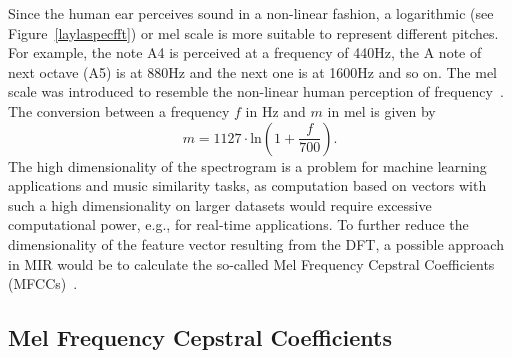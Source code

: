 \FloatBarrier
\noindent Since the human ear perceives sound in a non-linear fashion, a logarithmic (see Figure~\ref{laylaspecfft}) or mel scale is more suitable to represent different pitches. For example, the note A4 is perceived at a frequency of 440Hz, the A note of next octave (A5) is at 880Hz and the next one is at 1600Hz and so on. The mel scale was introduced to resemble the non-linear human perception of frequency~\cite[pp. 53f]{knees1}. The conversion between a frequency $f$ in $\text{Hz}$ and $m$ in $\text{mel}$ is given by
\begin{equation} \label{eq:mel}
m = 1127 \cdot \text{ln}(1 + \frac{f}{700}).
\end{equation}
\noindent The high dimensionality of the spectrogram is a problem for machine learning applications and music similarity tasks, as computation based on vectors with such a high dimensionality on larger datasets would require excessive computational power, e.g., for real-time applications.
To further reduce the dimensionality of the feature vector resulting from the DFT, a possible approach in MIR would be to calculate the so-called Mel Frequency Cepstral Coefficients (MFCCs)~\cite[pp. 55ff]{knees1}.

\subsection{Mel Frequency Cepstral Coefficients}\label{mfccsim}

